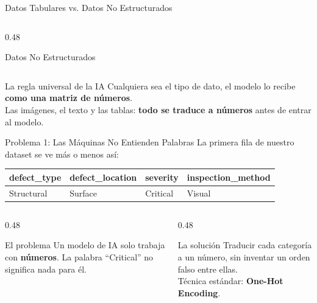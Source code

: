 \documentclass[aspectratio=169]{beamer}
\begin{document}
\begin{frame}{Datos Tabulares vs. Datos No Estructurados}
\begin{columns}[T]
\begin{column}{0.48\textwidth}
\begin{block}{\faImages\enspace Datos No Estructurados}
\begin{itemize}
        \end{itemize}
      \end{block}
    \end{column}
  \end{columns}
  \vspace{0.2cm}
  \begin{alertblock}{\faLightbulb\enspace La regla universal de la IA}
    \centering\small
    Cualquiera sea el tipo de dato, el modelo lo recibe \textbf{como una matriz de números}.\\
    Las imágenes, el texto y las tablas: \textbf{todo se traduce a números} antes de entrar al modelo.
  \end{alertblock}
\end{frame}


\begin{frame}{Problema 1: Las Máquinas No Entienden Palabras}
  \small
  La primera fila de nuestro dataset se ve más o menos así:

  \vspace{0.2cm}
  \centering
  {\footnotesize
  \begin{tabular}{|l|l|l|l|}
    \hline
    \textbf{defect\_type} & \textbf{defect\_location} & \textbf{severity} & \textbf{inspection\_method} \\\hline
    Structural & Surface & Critical & Visual \\\hline
  \end{tabular}}

  \vspace{0.3cm}
  \begin{columns}[T]
    \begin{column}{0.48\textwidth}
      \begin{alertblock}{\faExclamationTriangle\enspace El problema}
        \small
        Un modelo de IA solo trabaja con \textbf{números}. La palabra ``Critical'' no significa nada para él.
      \end{alertblock}
    \end{column}
    \begin{column}{0.48\textwidth}
      \begin{conceptbox}{\faCogs\enspace La solución}
        \small
        Traducir cada categoría a un número, sin inventar un orden falso entre ellas.\\[3pt]
        Técnica estándar: \textbf{One-Hot Encoding}.
      \end{conceptbox}
    \end{column}
  \end{columns}
\end{frame}
\end{document}
